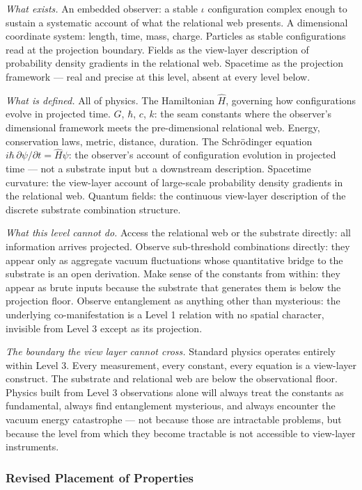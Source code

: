 \documentclass[11pt,letterpaper]{article}
\begin{document}
\emph{What exists.} An embedded observer: a stable \(\iota\) configuration complex enough to sustain a systematic account of what the relational web presents. A dimensional coordinate system: length, time, mass, charge. Particles as stable configurations read at the projection boundary. Fields as the view-layer description of probability density gradients in the relational web. Spacetime as the projection framework --- real and precise at this level, absent at every level below.

\emph{What is defined.} All of physics. The Hamiltonian \(\hat{H}\), governing how configurations evolve in projected time. \(G\), \(\hbar\), \(c\), \(k\): the seam constants where the observer's dimensional framework meets the pre-dimensional relational web. Energy, conservation laws, metric, distance, duration. The Schrödinger equation \(i\hbar\,\partial\psi/\partial t = \hat{H}\psi\): the observer's account of configuration evolution in projected time --- not a substrate input but a downstream description. Spacetime curvature: the view-layer account of large-scale probability density gradients in the relational web. Quantum fields: the continuous view-layer description of the discrete substrate combination structure.

\emph{What this level cannot do.} Access the relational web or the substrate directly: all information arrives projected. Observe sub-threshold combinations directly: they appear only as aggregate vacuum fluctuations whose quantitative bridge to the substrate is an open derivation. Make sense of the constants from within: they appear as brute inputs because the substrate that generates them is below the projection floor. Observe entanglement as anything other than mysterious: the underlying co-manifestation is a Level 1 relation with no spatial character, invisible from Level 3 except as its projection.

\emph{The boundary the view layer cannot cross.} Standard physics operates entirely within Level 3. Every measurement, every constant, every equation is a view-layer construct. The substrate and relational web are below the observational floor. Physics built from Level 3 observations alone will always treat the constants as fundamental, always find entanglement mysterious, and always encounter the vacuum energy catastrophe --- not because those are intractable problems, but because the level from which they become tractable is not accessible to view-layer instruments.

\subsubsection{Revised Placement of Properties}
\label{sec:org217794e}
\end{document}
